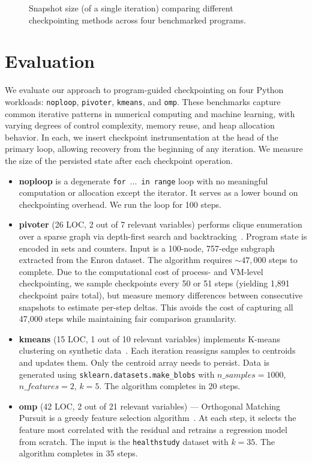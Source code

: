\begin{figure*}[t]
    \centering
  \else
    
  \fi
  \caption{Snapshot size (of a single iteration) comparing different checkpointing methods across four benchmarked programs.}
\end{figure*}

\section{Evaluation}
\label{sec:evaluation}
We evaluate our approach to program-guided checkpointing on four Python workloads: \texttt{noploop}, \texttt{pivoter}, \texttt{kmeans}, and \texttt{omp}. These benchmarks capture common iterative patterns in numerical computing and machine learning, with varying degrees of control complexity, memory reuse, and heap allocation behavior. In each, we insert checkpoint instrumentation at the head of the primary loop, allowing recovery from the beginning of any iteration. We measure the size of the persisted state after each checkpoint operation.

\begin{itemize}[leftmargin=*]
    \item \textbf{noploop} is a degenerate  {\color{blue!50!black}
\texttt{for}~\textrm{...}~\texttt{in}~\texttt{range}} loop with no meaningful computation or allocation except the iterator. It serves as a lower bound on checkpointing overhead. We run the loop for 100 steps.

    \item \textbf{pivoter} (26 LOC, 2 out of 7 relevant variables) performs clique enumeration over a sparse graph via depth-first search and backtracking~\cite{jain2020power}. Program state is encoded in sets and counters. Input is a 100-node, 757-edge subgraph extracted from the Enron dataset. The algorithm requires $\sim 47,000$ steps to complete. Due to the computational cost of process- and VM-level checkpointing, we sample checkpoints every 50 or 51 steps (yielding 1,891 checkpoint pairs total), but measure memory differences between consecutive snapshots to estimate per-step deltas. This avoids the cost of capturing all 47,000 steps while maintaining fair comparison granularity.

    \item \textbf{kmeans} (15 LOC, 1 out of 10 relevant variables) implements K-means clustering on synthetic data~\cite{macqueen1967multivariate}. Each iteration reassigns samples to centroids and updates them. Only the centroid array needs to persist. Data is generated using \texttt{sklearn.datasets.make\_blobs} with $n\_samples=1000$, $n\_features=2$, $k=5$. The algorithm completes in 20 steps.

    \item \textbf{omp} (42 LOC, 2 out of 21 relevant variables) --- Orthogonal Matching Pursuit is a greedy feature selection algorithm~\cite{Pati1993OMP, quinzan2022fast}. At each step, it selects the feature most correlated with the residual and retrains a regression model from scratch. The input is the \texttt{healthstudy} dataset with $k = 35$. The algorithm completes in 35 steps.
\end{itemize}

